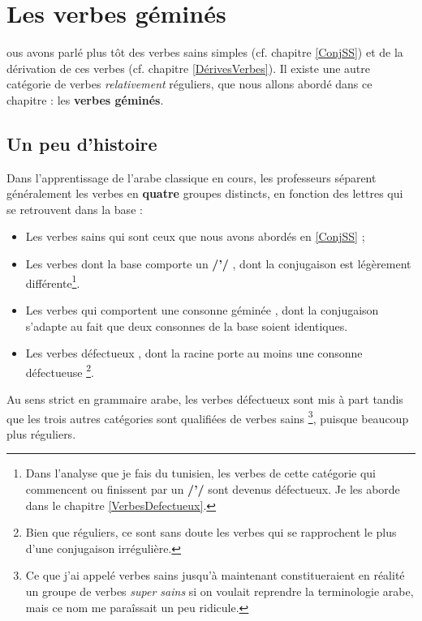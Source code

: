 \chapter{Les verbes géminés}
ous avons parlé plus tôt des verbes sains simples (cf. chapitre \ref{ConjSS}) et de la dérivation de ces verbes (cf. chapitre \ref{DérivesVerbes}). Il existe une autre catégorie de verbes \textit{relativement} réguliers, que nous allons abordé dans ce chapitre : les \textbf{verbes géminés}.


\section{Un peu d'histoire}
Dans l'apprentissage de l'arabe classique en cours, les professeurs séparent généralement les verbes en \textbf{quatre} groupes distincts, en fonction des lettres qui se retrouvent dans la base : 

\begin{itemize}
    \item Les verbes sains  qui sont ceux que nous avons abordés en \ref{ConjSS} ; 
    \item Les verbes dont la base comporte un \textbf{/'/} , dont la conjugaison est légèrement différente\footnote{Dans l'analyse que je fais du tunisien, les verbes de cette catégorie qui commencent ou finissent par un \textbf{/'/} sont devenus défectueux. Je les aborde dans le chapitre \ref{VerbesDefectueux}.}. 
    \item Les verbes qui comportent une consonne géminée , dont la conjugaison s'adapte au fait que deux consonnes de la base soient identiques.
    \item Les verbes défectueux , dont la racine porte au moins une consonne défectueuse \footnote{Bien que réguliers, ce sont sans doute les verbes qui se rapprochent le plus d'une conjugaison irrégulière.}. 
\end{itemize}

Au sens strict en grammaire arabe, les verbes défectueux sont mis à part tandis que les trois autres catégories sont qualifiées de verbes sains \footnote{Ce que j'ai appelé verbes sains jusqu'à maintenant constitueraient en réalité un groupe de verbes \textit{super sains} si on voulait reprendre la terminologie arabe, mais ce nom me paraîssait un peu ridicule.}, puisque beaucoup plus réguliers.

